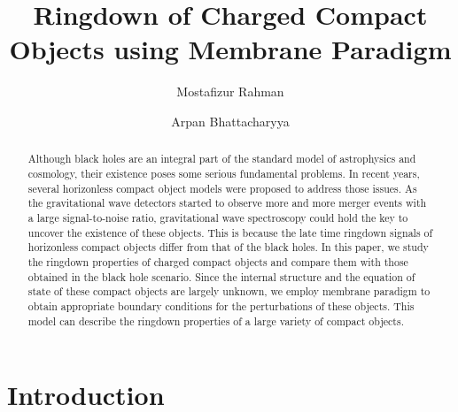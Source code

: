 \documentclass[aps,prd,twocolumn,floatfix,noshowpacs,tightenlines,noshowkeys,superscriptaddress,amsmath,amssymb,
nofootinbib]{revtex4-1}
\renewcommand\[{\begin{equation}}
\renewcommand\]{\end{equation}}
\begin{document}
\title{Ringdown of Charged Compact Objects using Membrane Paradigm}


\author{Mostafizur Rahman}

\author{Arpan Bhattacharyya}



\begin{abstract}
Although black holes are an integral part of the standard model of astrophysics and cosmology, their existence poses some serious fundamental problems. In recent years, several horizonless compact object models were proposed to address those issues. As the gravitational wave detectors started to observe more and more merger events with a large signal-to-noise ratio, gravitational wave spectroscopy could hold the key to uncover the existence of these objects. This is because the late time ringdown signals of horizonless compact objects differ from that of the black holes. In this paper, we study the ringdown properties of charged compact objects and compare them with those obtained in the black hole scenario. Since the internal structure and the equation of state of these compact objects are largely unknown, we employ membrane paradigm to obtain appropriate boundary conditions for the perturbations of these objects. This model can describe the ringdown properties of a large variety of compact objects.
\end{abstract}

\maketitle




\section{Introduction}\label{Intro}
\end{document}
